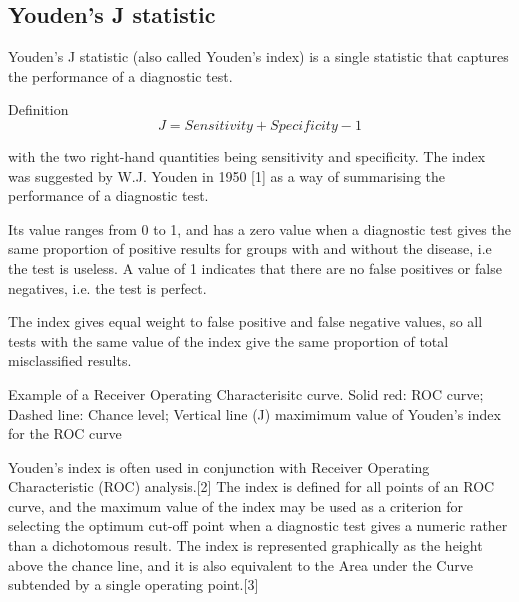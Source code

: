 \subsection{Youden's J statistic}

Youden's J statistic (also called Youden's index) is a single statistic that captures the performance of a diagnostic test.

Definition
\[ J = Sensitivity + Specificity − 1 \]

with the two right-hand quantities being sensitivity and specificity.
The index was suggested by W.J. Youden in 1950 [1] as a way of summarising the performance of a diagnostic test. 

Its value ranges from 0 to 1, and has a zero value when a diagnostic test gives the same proportion of positive results for groups with and without the disease, i.e the test is useless. A value of 1 indicates that there are no false positives or false negatives, i.e. the test is perfect. 

The index gives equal weight to false positive and false negative values, so all tests with the same value of the index give the same proportion of total misclassified results.

Example of a Receiver Operating Characterisitc curve. Solid red: ROC curve; Dashed line: Chance level; Vertical line (J) maximimum value of Youden's index for the ROC curve

Youden's index is often used in conjunction with Receiver Operating Characteristic (ROC) analysis.[2] The index is defined for all points of an ROC curve, and the maximum value of the index may be used as a criterion for selecting the optimum cut-off point when a diagnostic test gives a numeric rather than a dichotomous result. The index is represented graphically as the height above the chance line, and it is also equivalent to the Area under the Curve subtended by a single operating point.[3]
